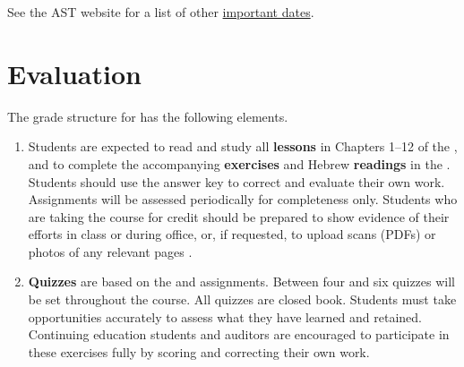 \documentclass[titlepage]{article}
\begin{document}
See the AST website for a list of other \href{http://www.astheology.ns.ca/students/academic-dates.html}{important dates}.

\section{Evaluation}
\label{evaluation}

The grade structure for \ccode has the following elements.

\begin{enumerate}
 \item
    Students are expected to read and study all \textbf{lessons} in
    Chapters 1–12 of the \cite{lbh}, and to complete the accompanying
    \textbf{exercises} and Hebrew \textbf{readings} in the \cite{work}.
    Students should use the answer key to correct and evaluate their own
    work. Assignments will be assessed periodically for completeness
    only. Students who are taking the course for credit should be
    prepared to show evidence of their efforts in class or during
    office, or, if requested, to upload scans (PDFs) or photos of any
    relevant pages \cite[3–34, 79–115]{work}.
 \item
    \textbf{Quizzes} are based on the \cite{lbh} and \cite{work}
    assignments. Between four and six quizzes will be set throughout the
    course. All quizzes are closed book. Students must take
    opportunities accurately to assess what they have learned and
    retained. Continuing education students and auditors are encouraged
    to participate in these exercises fully by scoring and correcting
    their own work.

\end{enumerate}
\end{document}
